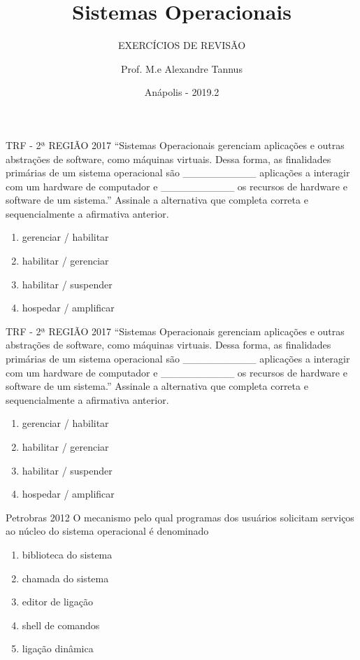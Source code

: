 \documentclass[aspectratio=169,
				xcolor=table]{beamer}
\institute[]{\uppercase{Engenharia de Software}}
\title[]{Sistemas Operacionais}
\subtitle[]{\uppercase{Exercícios de Revisão}}
\author[]{Prof. M.e Alexandre Tannus}
\date{Anápolis - 2019.2}
\begin{document}
	\begin{frame}
		\titlepage		
	\end{frame}

	\begin{frame}{TRF - 2ª REGIÃO 2017}
		“Sistemas Operacionais gerenciam aplicações e outras abstrações de software, como máquinas virtuais. Dessa forma, as finalidades primárias de um sistema operacional são __________ aplicações a interagir com um hardware de computador e __________ os recursos de hardware e software de um sistema.” Assinale a alternativa que completa correta e sequencialmente a afirmativa anterior.
		
		\begin{enumerate}[a]		
			\item gerenciar / habilitar 
			\item habilitar / gerenciar
			\item habilitar / suspender 
			\item hospedar / amplificar
		\end{enumerate}
	\end{frame}		

	\begin{frame}{TRF - 2ª REGIÃO 2017}
		“Sistemas Operacionais gerenciam aplicações e outras abstrações de software, como máquinas virtuais. Dessa forma, as finalidades primárias de um sistema operacional são __________ aplicações a interagir com um hardware de computador e __________ os recursos de hardware e software de um sistema.” Assinale a alternativa que completa correta e sequencialmente a afirmativa anterior.
		
		\begin{enumerate}[a]		
			\item gerenciar / habilitar 
			\item \alert{habilitar / gerenciar}
			\item habilitar / suspender 
			\item hospedar / amplificar
		\end{enumerate}
	\end{frame}		

		
	\begin{frame}{Petrobras 2012}
		O mecanismo pelo qual programas dos usuários solicitam serviços ao núcleo do sistema operacional é denominado
		\begin{enumerate}[a]
			\item biblioteca do sistema
			\item chamada do sistema
			\item editor de ligação 
			\item shell de comandos
			\item ligação dinâmica
		\end{enumerate}
	\end{frame}
\end{document}
